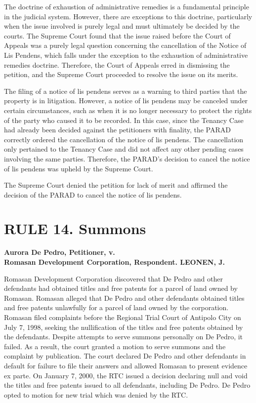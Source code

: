 \documentclass[
12pt,
oneside,
onehalfspacing,
headsepline
]{DigestCollection}
\begin{document}
The doctrine of exhaustion of administrative remedies is a fundamental principle in the judicial system. However, there are exceptions to this doctrine, particularly when the issue involved is purely legal and must ultimately be decided by the courts. The Supreme Court found that the issue raised before the Court of Appeals was a purely legal question concerning the cancellation of the Notice of Lis Pendens, which falls under the exception to the exhaustion of administrative remedies doctrine. Therefore, the Court of Appeals erred in dismissing the petition, and the Supreme Court proceeded to resolve the issue on its merits.

The filing of a notice of lis pendens serves as a warning to third parties that the property is in litigation. However, a notice of lis pendens may be canceled under certain circumstances, such as when it is no longer necessary to protect the rights of the party who caused it to be recorded. In this case, since the Tenancy Case had already been decided against the petitioners with finality, the PARAD correctly ordered the cancellation of the notice of lis pendens. The cancellation only pertained to the Tenancy Case and did not affect any other pending cases involving the same parties. Therefore, the PARAD's decision to cancel the notice of lis pendens was upheld by the Supreme Court.

The Supreme Court denied the petition for lack of merit and affirmed the decision of the PARAD to cancel the notice of lis pendens.

\chapter{RULE 14. Summons}



\noindent\textbf{Aurora De Pedro, Petitioner, v. \\Romasan Development Corporation, Respondent. LEONEN, J.}\vspace{0.4cm}

Romasan Development Corporation discovered that De Pedro and other defendants had obtained titles and free patents for a parcel of land owned by Romasan. Romasan alleged that De Pedro and other defendants obtained titles and free patents unlawfully for a parcel of land owned by the corporation. Romasan filed complaints before the Regional Trial Court of Antipolo City on July 7, 1998, seeking the nullification of the titles and free patents obtained by the defendants. Despite attempts to serve summons personally on De Pedro, it failed. As a result, the court granted a motion to serve summons and the complaint by publication. The court declared De Pedro and other defendants in default for failure to file their answers and allowed Romasan to present evidence ex parte. On January 7, 2000, the RTC issued a decision declaring null and void the titles and free patents issued to all defendants, including De Pedro. De Pedro opted to motion for new trial which was denied by the RTC.
\end{document}
